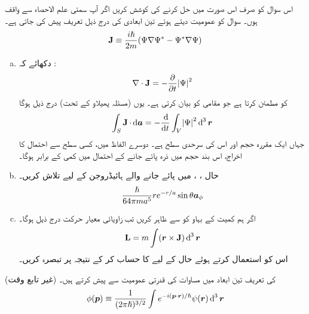 اس سوال کو صرف اس صورت میں حل کرنے کی کوشش کریں اگر آپ سمتی علم الاحصاء سے واقف ہوں۔ سوال  کو عمومیت دیتے ہوئے تین ابعادی  کی درج ذیل تعریف پیش کی جاتی ہے۔
\begin{align}
\operatorname{\mathbf{J}} \equiv \frac{i \hslash}{2 m} (\Psi \nabla \Psi^* - \Psi^* \nabla \Psi)
\end{align}
\begin{enumerate}[a.]
\item
دکھائے کہ  : 
\begin{align}
\nabla \cdot \operatorname{\mathbf{J}} = - \frac{\partial}{\partial t} \abs{\Psi}^2
\end{align}
کو مطمئن کرتا ہے جو مقامی  کو بیان کرتی ہے۔ یوں (مسئلہ پھیلاو کے تحت) درج ذیل ہوگا 
\begin{align}
\int_S \mat{J} \cdot \dif \kvec{a} = - \frac{\dif}{\dif t} \int_V \abs{\Psi}^2 \dif^{\,3} \kvec{r}
\end{align}
جہاں  ایک مقررہ حجم اور  اس کی سرحدی سطح ہے۔ دوسرے الفاظ میں، کسی سطح سے احتمال کا اخراج، اس بند حجم میں ذرہ پائے جانے کے احتمال میں کمی کے برابر ہوگا۔
\item
حال ، ،  میں پائے جانے والے ہائیڈروجن کے لیے  تلاش کریں۔  
\begin{align*}
\frac{\hslash}{64 \pi m a^5} r e^{- r/a} \sin \theta {\boldsymbol{a}}_{\phi}
\end{align*}
\item
اگر ہم کمیت کے بہاو کو  سے ظاہر کریں تب زاویائی معیار حرکت درج ذیل ہوگا۔
\begin{align*}
\mat{L} = m \int (\kvec{r} \times \mat{J}) \dif^{\,3} \kvec{r}
\end{align*}
اس کو استعمال کرتے ہوئے حال  کے لیے  کا حساب کر کے نتیجہ پر تبصرہ کریں۔ 
\end{enumerate}
(غیر تابع وقت)  کی تعریف تین ابعاد میں مساوات  کی قدرتی عمومیت سے پیش کرتے ہیں۔ 
\begin{align}
\phi (\kvec{p}) \equiv \frac{1}{(2 \pi \hslash)^{3/2}} \int e^{- i(\kvec{p} \cdot \kvec{r})/\hslash} \psi (\kvec{r}) \dif^{\,3} \kvec{r}
\end{align}
